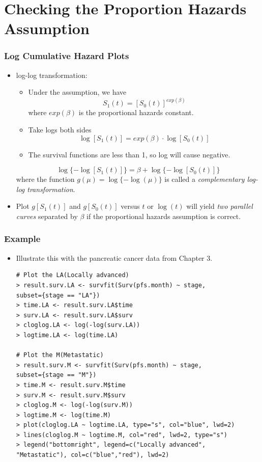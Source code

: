 \documentclass{beamer}
\newcommand{\empr}[1]{{\emph{\color{red}#1}}}
\begin{document}
\section{Checking the Proportion Hazards Assumption}
\begin{frame}
\frametitle{Log Cumulative Hazard Plots}
\begin{itemize}
\item log-log transformation:
\begin{itemize}
\item Under the assumption, we have 
	\begin{equation}
	S_1(t) = [S_0(t)]^{exp(\beta)}
	\end{equation}
where $exp(\beta)$ is the proportional hazards constant.
\item Take logs both sides
\begin{equation}
\log[S_1(t)] = exp(\beta)\cdot \log[S_0(t)]
\end{equation}
\item The survival functions are less than 1, so log will cause negative.
\end{itemize}
\begin{equation}
\log \lbrace -\log[S_1(t)]\rbrace = \beta + \log \lbrace -\log[S_0(t)]\rbrace
\end{equation}
where the function $g(\mu) = \log \lbrace -\log(\mu) \rbrace$ is called a \empr{complementary log-log transformation}.
\item Plot $g[S_1(t)]$ and $g[S_0(t)]$ versus $t$ or $\log(t)$ will yield \empr{two parallel curves} separated by $\beta$ if the proportional hazards assumption is correct.
\end{itemize}
\end{frame}

\pagebreak
\begin{frame}[fragile]
\frametitle{Example}
\begin{itemize}
\item Illustrate this with the pancreatic cancer data from Chapter 3.
\begin{Verbatim}
# Plot the LA(Locally advanced)
> result.surv.LA <- survfit(Surv(pfs.month) ~ stage,
subset={stage == "LA"})
> time.LA <- result.surv.LA$time
> surv.LA <- result.surv.LA$surv
> cloglog.LA <- log(-log(surv.LA))
> logtime.LA <- log(time.LA)

# Plot the M(Metastatic)
> result.surv.M <- survfit(Surv(pfs.month) ~ stage, 
subset={stage == "M"})
> time.M <- result.surv.M$time
> surv.M <- result.surv.M$surv
> cloglog.M <- log(-log(surv.M))
> logtime.M <- log(time.M)
> plot(cloglog.LA ~ logtime.LA, type="s", col="blue", lwd=2)
> lines(cloglog.M ~ logtime.M, col="red", lwd=2, type="s")
> legend("bottomright", legend=c("Locally advanced",
"Metastatic"), col=c("blue","red"), lwd=2)
\end{Verbatim}
\end{itemize}
\end{frame}
\end{document}
